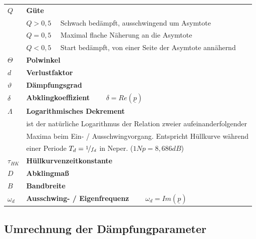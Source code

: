 \documentclass[a4paper, 12pt]{report}
\begin{document}
    \begin{table}[h]
        \begin{tabular}{lll}
        $ Q $ & \multicolumn{2}{l}{\textbf{Güte}} \\
        ~ & $ Q > 0,5 $ & Schwach bedämpft, ausschwingend um Asymtote \\
        ~ & $ Q = 0,5 $ & Maximal flache Näherung an die Asymtote \\
        ~ & $ Q < 0,5 $ & Start bedämpft, von einer Seite der Asymtote annähernd \\
        $ \varTheta $ & \multicolumn{2}{l}{\textbf{Polwinkel}} \\
        $ d $ & \multicolumn{2}{l}{\textbf{Verlustfaktor}} \\
        $ \vartheta $ & \multicolumn{2}{l}{\textbf{Dämpfungsgrad}} \\
        $ \delta $ & \multicolumn{2}{l}{\textbf{Abklingkoeffizient} $ \qquad \delta = Re({\underline{p}}) $} \\
        $ \Lambda $ & \multicolumn{2}{l}{\textbf{Logarithmisches Dekrement}} \\
        ~ & \multicolumn{2}{l}{ist der natürliche Logarithmus der Relation zweier aufeinanderfolgender} \\
        ~ & \multicolumn{2}{l}{Maxima beim Ein- / Ausschwingvorgang. Entspricht Hüllkurve während} \\
        ~ & \multicolumn{2}{l}{einer Periode $ T_d = \nicefrac{1}{f_d} $ in Neper. ($ 1Np = 8,686dB $)} \\
        $ \tau_{HK} $ & \multicolumn{2}{l}{\textbf{Hüllkurvenzeitkonstante}} \\
        $ D $ & \multicolumn{2}{l}{\textbf{Abklingmaß}} \\
        $ B $ & \multicolumn{2}{l}{\textbf{Bandbreite}} \\
        $ \omega_d $ & \multicolumn{2}{l}{\textbf{Ausschwing- / Eigenfrequenz} $ \qquad \omega_d = Im(\underline{p}) $} \\
        \end{tabular}
    \end{table}
    
\subsection*{Umrechnung der Dämpfungparameter}
    
\end{document}

